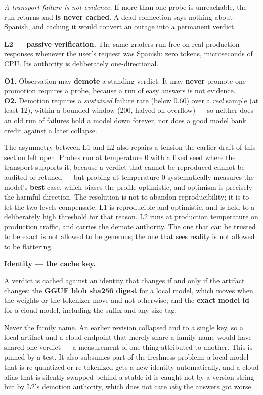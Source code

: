 \emph{A transport failure is not evidence.} If more than one probe is
unreachable, the run returns  and \textbf{is never cached}. A
dead connection says nothing about Spanish, and caching it would convert an
outage into a permanent verdict.

\textbf{L2 --- passive verification.} The same graders run free on real
production responses whenever the user's request was Spanish: zero tokens,
microseconds of CPU. Its authority is deliberately one-directional.

\begin{keyinsight}
\textbf{O1.} Observation may \textbf{demote} a standing verdict. It may
\textbf{never} promote one --- promotion requires a probe, because a run of easy
answers is not evidence.\\
\textbf{O2.} Demotion requires a \emph{sustained} failure rate (below 0.60) over
a \emph{real} sample (at least 12), within a bounded window (200, halved on
overflow) --- so neither does an old run of failures hold a model down forever,
nor does a good model bank credit against a later collapse.
\end{keyinsight}

The asymmetry between L1 and L2 also repairs a tension the earlier draft of this
section left open. Probes run at temperature 0 with a fixed seed where the
transport supports it, because a verdict that cannot be reproduced cannot be
audited or retuned --- but probing at temperature 0 systematically measures the
model's \textbf{best} case, which biases the profile optimistic, and optimism is
precisely the harmful direction. The resolution is not to abandon
reproducibility; it is to let the two levels compensate. L1 is reproducible and
optimistic, and is held to a deliberately high  threshold for that
reason. L2 runs at production temperature on production traffic, and carries the
demote authority. The one that can be trusted to be exact is not allowed to be
generous; the one that sees reality is not allowed to be flattering.

\textbf{Identity --- the cache key.}

A verdict is cached against an identity that changes if and only if the artifact
changes: the \textbf{GGUF blob sha256 digest} for a local model, which moves
when the weights or the tokenizer move and not otherwise; and the \textbf{exact
model id} for a cloud model, including the  suffix and any size
tag.

Never the family name. An earlier revision collapsed  and
 to a single key, so a local artifact and a cloud endpoint that
merely share a family name would have shared one verdict --- a measurement of
one thing attributed to another. This is pinned by a test. It also subsumes part
of the freshness problem: a local model that is re-quantized or re-tokenized
gets a new identity automatically, and a cloud alias that is silently swapped
behind a stable id is caught not by a version string but by L2's demotion
authority, which does not care \emph{why} the answers got worse.

